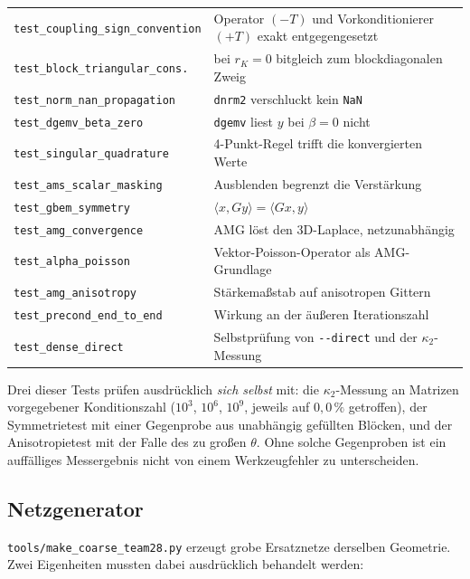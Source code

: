 \documentclass[11pt,a4paper]{article}
\newcommand{\code}[1]{\texttt{\small #1}}
\newcommand{\kappazwei}{\kappa_2}
\begin{document}
\begin{center}
\small
\begin{tabular}{ll}
\toprule
\code{test\_coupling\_sign\_convention} & Operator $(-T)$ und Vorkonditionierer
  $(+T)$ exakt entgegengesetzt \\
\code{test\_block\_triangular\_cons.} & bei $r_K=0$ bitgleich zum
  blockdiagonalen Zweig \\
\code{test\_norm\_nan\_propagation} & \code{dnrm2} verschluckt kein \code{NaN}
  \\
\code{test\_dgemv\_beta\_zero} & \code{dgemv} liest $y$ bei $\beta=0$ nicht \\
\code{test\_singular\_quadrature} & 4-Punkt-Regel trifft die konvergierten
  Werte \\
\code{test\_ams\_scalar\_masking} & Ausblenden begrenzt die Verstärkung \\
\code{test\_gbem\_symmetry} & $\langle x,Gy\rangle = \langle Gx,y\rangle$ \\
\code{test\_amg\_convergence} & AMG löst den 3D-Laplace, netzunabhängig \\
\code{test\_alpha\_poisson} & Vektor-Poisson-Operator als AMG-Grundlage \\
\code{test\_amg\_anisotropy} & Stärkemaßstab auf anisotropen Gittern \\
\code{test\_precond\_end\_to\_end} & Wirkung an der äußeren
  Iterationszahl \\
\code{test\_dense\_direct} & Selbstprüfung von \code{-{}-direct} und der
  $\kappazwei$-Messung \\
\bottomrule
\end{tabular}
\end{center}

\noindent
Drei dieser Tests prüfen ausdrücklich \emph{sich selbst} mit: die
$\kappazwei$-Messung an Matrizen vorgegebener Konditionszahl ($10^{3}$,
$10^{6}$, $10^{9}$, jeweils auf $0{,}0\,\%$ getroffen), der Symmetrietest mit
einer Gegenprobe aus unabhängig gefüllten Blöcken, und der Anisotropietest mit
der Falle des zu großen $\theta$. Ohne solche Gegenproben ist ein auffälliges
Messergebnis nicht von einem Werkzeugfehler zu unterscheiden.

\subsection{Netzgenerator}

\code{tools/make\_coarse\_team28.py} erzeugt grobe Ersatznetze derselben
Geometrie. Zwei Eigenheiten mussten dabei ausdrücklich behandelt werden:
\end{document}
